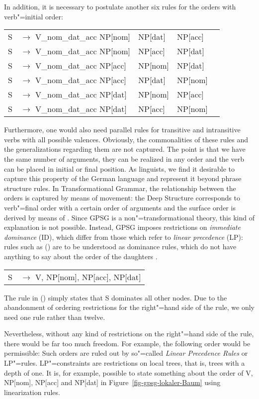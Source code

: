 \noindent
In addition, it is necessary to postulate another six rules for the orders with verb"=initial order:
\ea
\begin{tabular}[t]{@{}l@{ }l@{ }l@{ }l@{ }l}
S  & $\to$ V\_nom\_dat\_acc NP[nom]& NP[dat] & NP[acc]\\
S  & $\to$ V\_nom\_dat\_acc NP[nom]& NP[acc] & NP[dat]\\
S  & $\to$ V\_nom\_dat\_acc NP[acc]& NP[nom] & NP[dat]\\
S  & $\to$ V\_nom\_dat\_acc NP[acc]& NP[dat] & NP[nom]\\
S  & $\to$ V\_nom\_dat\_acc NP[dat]& NP[nom] & NP[acc]\\
S  & $\to$ V\_nom\_dat\_acc NP[dat]& NP[acc] & NP[nom]\\
\end{tabular}
\z

\noindent
Furthermore, one would also need parallel rules for transitive and intransitive verbs with all
possible valences. Obviously, the commonalities of these rules and the generalizations regarding
them are not captured. The point is that we have the same number of arguments, they can be
realized in any order and the verb can be placed in initial or final position. As linguists, we find it
desirable to capture this property of the German language and represent it beyond phrase structure 
rules. In Transformational Grammar, the relationship between the orders is captured by means of movement: the Deep Structure corresponds
to verb"=final order with a certain order of arguments and the surface order is derived by means of \movealpha. Since GPSG is a non"=transformational
theory, this kind of explanation is not possible. Instead, GPSG imposes restrictions on \emph{immediate dominance} (ID), which differ
from those which refer to \emph{linear precedence} (LP): rules such as () are to be understood as dominance rules, which do not
have anything to say about the order of the daughters \citep{Pullum82a}.
\ea
\begin{tabular}[t]{@{}l@{ }l}
S  & $\to$ V, NP[nom], NP[acc], NP[dat]\\
\end{tabular}
\z
The rule in () simply states that S dominates all other nodes. Due to the abandonment of ordering restrictions for the right"=hand side of the rule, we
only need one rule rather than twelve. 

Nevertheless, without any kind of restrictions on the right"=hand side of the rule, there would be far too much freedom. For example, the following order would be
permissible:
\z
Such orders are ruled out by so"=called \emph{Linear Precedence Rules} or LP"=rules. LP"=constraints are restrictions on
local trees, that is, trees with a depth of one. It is, for example, possible to state something
about the order of V, NP[nom], NP[acc] and NP[dat] in Figure~\vref{fig-gpsg-lokaler-Baum} using linearization
rules.

